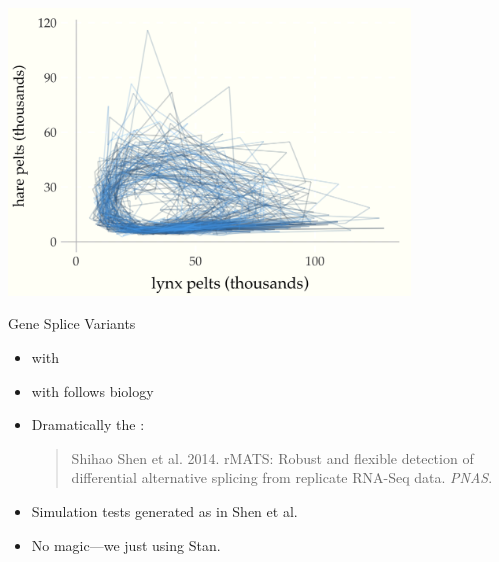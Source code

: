 \documentclass[10pt]{report}
\begin{document}
\begin{center}
\includegraphics[width=0.8\textwidth]{img/lotka-volterra-posterior-time.png}
\end{center}

       {Gene Splice Variants}

\begin{itemize}
\item {} with
\item {} with  follows biology
\item Dramatically  the :
\begin{quote}
\footnotesize Shihao Shen et al. 2014. rMATS: Robust and flexible detection of
differential alternative splicing from replicate RNA-Seq data.
{\slshape PNAS}.
\end{quote}
\item Simulation tests generated as in Shen et al.
\item No magic---we just  using Stan.
\end{itemize}
\end{document}
